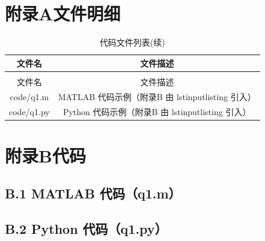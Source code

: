\documentclass{JXUSTmodeling}
\begin{document}
\newpage
\section*{附录A文件明细}
\begin{longtable}{cc}
	\caption{代码文件列表}
	\label{tab:codefile}\\
	\toprule[1.5pt]
	文件名 & 文件描述 \\
	\midrule
	\endfirsthead
	\caption[]{代码文件列表(续)}\\
	\toprule[1.5pt]
	文件名 & 文件描述 \\
	\midrule
	\endhead
	\bottomrule[1.5pt]
	\endfoot
	code/q1.m & MATLAB 代码示例（附录B 由 lstinputlisting 引入） \\
	code/q1.py & Python 代码示例（附录B 由 lstinputlisting 引入） \\
\end{longtable}

\section*{附录B代码}

\subsection*{B.1 MATLAB 代码（q1.m）}


\subsection*{B.2 Python 代码（q1.py）}

\end{document}
